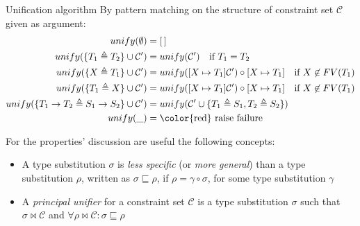 \documentclass[8pt]{beamer}
\begin{document}
\begin{frame}
    \begin{block}{Unification algorithm}
        By pattern matching on the structure of constraint set $\mathcal{C}$
        given as argument:
        \begin{displaymath}
            \begin{split}
                unify(\emptyset) &= [\,] \\
                unify(\{T_1 \triangleq T_2\} \cup \mathcal{C}^{\prime}) &=
                    unify(\mathcal{C}^{\prime})
                    \quad \text{if } T_1 = T_2\\
                unify(\{X \triangleq T_1\} \cup \mathcal{C}^{\prime}) &=
                    unify([ X \mapsto T_1]\mathcal{C}^{\prime}) \circ [X \mapsto T_1]
                    \quad \text{if } X \not \in FV(T_1)\\
                unify(\{T_1 \triangleq X\} \cup \mathcal{C}^{\prime}) &=
                    unify([ X \mapsto T_1]\mathcal{C}^{\prime}) \circ [X \mapsto T_1]
                    \quad \text{if } X \not \in FV(T_1)\\
                unify(\{T_1 \rightarrow T_2 \triangleq S_1\rightarrow S_2 \} 
                    \cup \mathcal{C}^{\prime}) &=
                    unify(\mathcal{C}^{\prime} \cup \{T_1 \triangleq S_1,
                        T_2 \triangleq S_2\}) \\
                unify(\_) &= \text{\color{red} raise failure}\\
            \end{split}
        \end{displaymath}
    \end{block}
    \pause
    For the properties' discussion are useful the following concepts:
    \begin{itemize}
        \item   A type substitution $\sigma$ is \emph{less specific} (or 
                \emph{more general}) than a type substitution $\rho$, written
                as $\sigma \sqsubseteq \rho$, if $\rho = \gamma \circ \sigma$,
                for some type substitution $\gamma$
        \item   A \emph{principal unifier} for a constraint set $\mathcal{C}$ 
                is a type substitution $\sigma$ such that $\sigma \Join \mathcal{C}$
                and $\forall \rho \Join \mathcal{C}: \sigma \sqsubseteq \rho$
    \end{itemize}
\end{frame}
\end{document}
